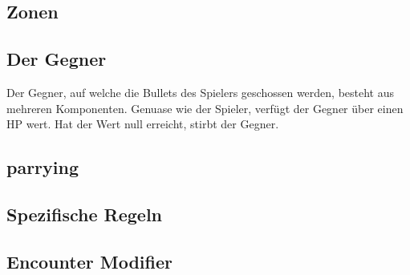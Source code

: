 

\subsection{Zonen}\label{backpack_and_deck}

\subsection{Der Gegner}\label{backpack_and_deck}
Der Gegner, auf welche die Bullets des Spielers geschossen werden, besteht aus mehreren Komponenten.
Genuase wie der Spieler, verfügt der Gegner über einen HP wert. Hat der Wert null erreicht, stirbt der Gegner.

\subsection{parrying}\label{backpack_and_deck}

\subsection{Spezifische Regeln}\label{spezifische_regeln}

\subsection{Encounter Modifier}\label{backpack_and_deck}
%

\renewcommand{\kapitelautor}{}
